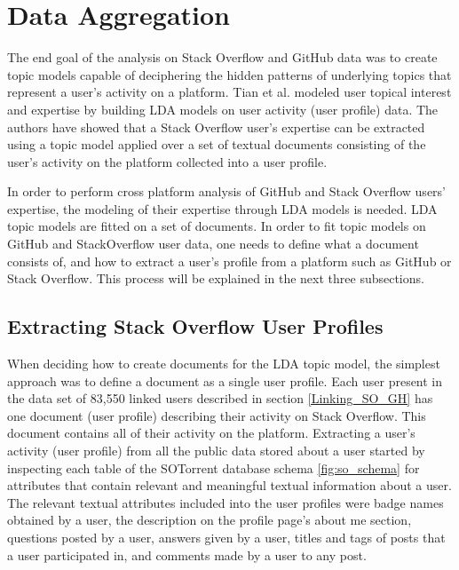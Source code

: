 \section{Data Aggregation} 

    The end goal of the analysis on Stack Overflow and GitHub data was to create topic models capable of deciphering the hidden patterns of underlying topics that represent a user's activity on a platform. Tian et al. \cite{tian2013predicting} modeled user topical interest and expertise by building LDA models on user activity (user profile) data. The authors have showed that a Stack Overflow user's expertise can be extracted using a topic model applied over a set of textual documents consisting of the user's activity on the platform collected into a user profile.

    In order to perform cross platform analysis of GitHub and Stack Overflow users' expertise, the modeling of their expertise through LDA models is needed. LDA topic models are fitted on a set of documents. In order to fit topic models on GitHub and StackOverflow user data, one needs to define what a document consists of, and how to extract a user's profile from a platform such as GitHub or Stack Overflow. This process will be explained in the next three subsections.
    
    \subsection{Extracting Stack Overflow User Profiles\label{SO_userProfileExtraction}}
    
        When deciding how to create documents for the LDA topic model, the simplest approach was to define a document as a single user profile. Each user present in the data set of 83,550 linked users described in section \ref{Linking_SO_GH} has one document (user profile) describing their activity on Stack Overflow. This document contains all of their activity on the platform. Extracting a user's activity (user profile) from all the public data stored about a user started by inspecting each table of the SOTorrent database schema \ref{fig:so_schema} for attributes that contain relevant and meaningful textual information about a user. The relevant textual attributes included into the user profiles were badge names obtained by a user, the description on the profile page's about me section, questions posted by a user, answers given by a user, titles and tags of posts that a user participated in, and comments made by a user to any post. 
          
